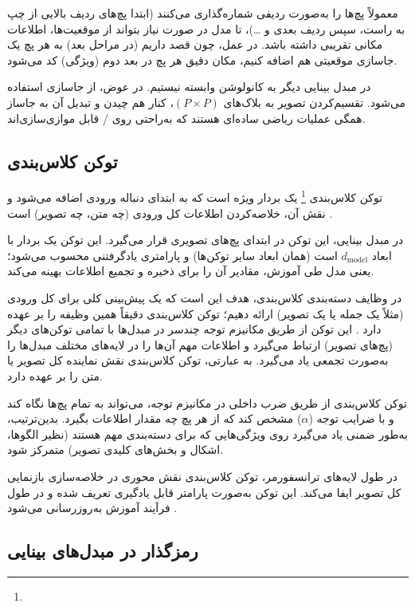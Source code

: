 معمولاً پچ‌ها را به‌صورت ردیفی شماره‌گذاری می‌کنند (ابتدا پچ‌های ردیف بالایی از چپ به راست، سپس ردیف بعدی و …)، تا مدل در صورت نیاز بتواند از موقعیت‌ها، اطلاعات مکانی تقریبی داشته باشد.
در عمل، چون قصد داریم (در مراحل بعد) به هر پچ یک جاسازی موقعیتی هم اضافه کنیم، مکان دقیق هر پچ در بعد دوم (ویژگی) کد می‌شود.

در مبدل بینایی \cite{dosovitskiy2020image} دیگر به کانولوشن وابسته نیستیم. در عوض، از جاسازی استفاده می‌شود.
تقسیم‌کردن تصویر به بلاک‌های \((P \times P)\)، کنار هم چیدن و تبدیل آن به جاساز همگی عملیات ریاضی ساده‌ای هستند که به‌راحتی روی / قابل موازی‌سازی‌اند.

\subsection{توکن کلاس‌بندی}
توکن کلاس‌بندی \footnote{} یک بردار ویژه است که به ابتدای دنباله ورودی اضافه می‌شود و نقش آن، خلاصه‌کردن اطلاعات کل ورودی (چه متن، چه تصویر) است \cite{devlin2018bert,dosovitskiy2020image}.

در مبدل بینایی، این توکن در ابتدای پچ‌های تصویری قرار می‌گیرد.
این توکن یک بردار با ابعاد \(d_{\text{model}}\) است (همان ابعاد سایر توکن‌ها) و پارامتری یادگرفتنی محسوب می‌شود؛ یعنی مدل طی آموزش، مقادیر آن را برای ذخیره و تجمیع اطلاعات بهینه می‌کند.

در وظایف دسته‌بندی کلاس‌بندی، هدف این است که یک پیش‌بینی کلی برای کل ورودی (مثلاً یک جمله یا یک تصویر) ارائه دهیم؛ توکن کلاس‌بندی دقیقاً همین وظیفه را بر عهده دارد \cite{devlin2018bert}. این توکن از طریق مکانیزم توجه چندسر در مبدل‌ها با تمامی توکن‌های دیگر (پچ‌های تصویر) ارتباط می‌گیرد و اطلاعات مهم آن‌ها را در لایه‌های مختلف مبدل‌ها را به‌صورت تجمعی یاد می‌گیرد. به عبارتی، توکن کلاس‌بندی نقش نماینده کل تصویر یا متن را بر عهده دارد.

توکن کلاس‌بندی از طریق ضرب داخلی در مکانیزم توجه، می‌تواند به تمام پچ‌ها نگاه کند و با ضرایب توجه (\(\alpha\)) مشخص کند که از هر پچ چه مقدار اطلاعات بگیرد. بدین‌ترتیب، به‌طور ضمنی یاد می‌گیرد روی ویژگی‌هایی که برای دسته‌بندی مهم هستند (نظیر الگوها، اشکال و بخش‌های کلیدی تصویر) متمرکز شود.

در طول لایه‌های ترانسفورمر، توکن کلاس‌بندی نقش محوری در خلاصه‌سازی بازنمایی کل تصویر ایفا می‌کند. این توکن به‌صورت پارامتر قابل یادگیری تعریف شده و در طول فرآیند آموزش به‌روزرسانی می‌شود \cite{devlin2018bert,dosovitskiy2020image}.

\subsection{رمزگذار در مبدل‌های بینایی}

